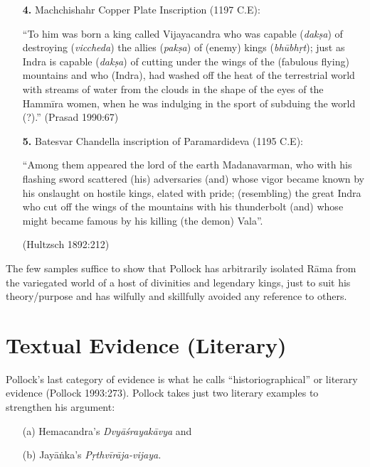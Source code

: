 \begin{itemize}
\item[{\bf 4.}] Machchishahr Copper Plate Inscription (1197 C.E): 

“To him was born a king called Vijayacandra who was capable ({\sl dakṣa}) of destroying ({\sl viccheda}) the allies ({\sl pakṣa}) of (enemy) kings ({\sl bhūbhṛt}); just as Indra is capable ({\sl dakṣa}) of cutting under the wings of the (fabulous flying) mountains and who (Indra), had washed off the heat of the terrestrial world with streams of water from the clouds in the shape of the eyes of the Hammīra women, when he was indulging in the sport of subduing the world (?).”
\hfill (Prasad 1990:67)

\item[{\bf 5.}] Batesvar Chandella inscription of Paramardideva (1195 C.E): 

“Among them appeared the lord of the earth Madanavarman, who with his flashing sword scattered (his) adversaries (and) whose vigor became known by his onslaught on hostile kings, elated with pride; (resembling) the great Indra who cut off the wings of the mountains with his thunderbolt (and) whose might became famous by his killing (the demon) Vala”.

\hfill (Hultzsch 1892:212)
\end{itemize}

The few samples suffice to show that Pollock has arbitrarily isolated Rāma from the variegated world of a host of divinities and legendary kings, just to suit his theory/purpose and has wilfully and skillfully avoided any reference to others.


\section{Textual Evidence (Literary)}\label{sec3.3}

Pollock’s last category of evidence is what he calls “historiographical” or literary evidence (Pollock 1993:273). Pollock takes just two literary examples to strengthen his argument: 
\begin{itemize}
\itemsep=1pt
\item[(a)] Hemacandra’s {\sl Dvyāśrayakāvya} and
\item[(b)] Jayāṅka’s {\sl Pṛthvīrāja-vijaya.}
\end{itemize}

